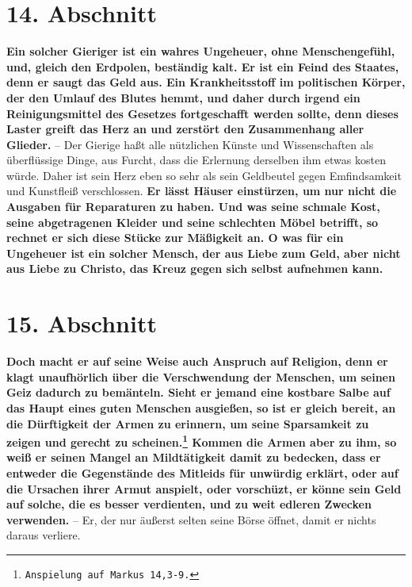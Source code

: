 \section{14. Abschnitt} \label{kap13_ab14}

\label{ref:13_14_reichtum_schaden}
\textbf{Ein solcher Gieriger ist ein wahres Ungeheuer,
ohne Menschengefühl, und, gleich
den Erdpolen, beständig kalt. Er ist ein Feind des Staates, denn er saugt das
Geld aus. Ein Krankheitsstoff im politischen Körper, der den Umlauf des Blutes
hemmt, und daher durch irgend ein Reinigungsmittel des
Gesetzes fortgeschafft
werden sollte, denn dieses Laster greift das Herz an und zerstört den
Zusammenhang aller Glieder.} -- Der Gierige haßt alle nützlichen
Künste und
Wissenschaften als überflüssige Dinge, aus
Furcht, dass die Erlernung derselben
ihm etwas kosten würde. Daher ist sein Herz eben so
sehr als sein Geldbeutel
gegen Emfindsamkeit und Kunstfleiß verschlossen. \label{ref:13_14_reichtum_einsturz}
\textbf{Er lässt Häuser einstürzen, um
nur nicht die Ausgaben für Reparaturen zu haben. Und was seine schmale Kost,
seine abgetragenen Kleider und seine schlechten Möbel betrifft, so rechnet er
sich diese Stücke zur Mäßigkeit an. O was für ein Ungeheuer ist ein solcher
Mensch, der aus Liebe zum Geld, aber nicht aus Liebe zu Christo, das
Kreuz
gegen sich selbst aufnehmen kann.}

\section{15. Abschnitt} \label{kap13_ab15}

\label{ref:13_15_Kapitalisten_kritik}
\textbf{Doch macht er auf seine Weise auch Anspruch auf Religion, denn er klagt
unaufhörlich über die Verschwendung der Menschen, um seinen
Geiz dadurch zu
bemänteln. Sieht er jemand eine kostbare Salbe auf das Haupt eines guten
Menschen ausgießen, so ist er gleich bereit, an die Dürftigkeit der Armen zu
erinnern, um seine Sparsamkeit zu zeigen und gerecht zu scheinen.\footnote{\texttt{Anspielung auf Markus 14,3-9.}}
Kommen die
Armen aber zu ihm, so weiß er seinen Mangel an
Mildtätigkeit damit zu bedecken,
dass er entweder die Gegenstände des Mitleids für unwürdig erklärt, oder auf die
Ursachen ihrer Armut anspielt, oder vorschüzt, er könne
sein Geld auf solche,
die es besser verdienten, und zu weit edleren Zwecken verwenden.} -- Er, der nur
äußerst selten seine Börse öffnet, damit er nichts daraus verliere.

